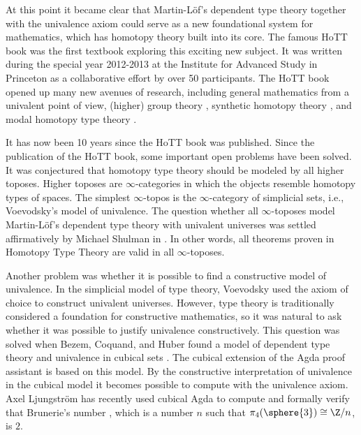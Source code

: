 At this point it became clear that Martin-L\"of's dependent type theory together with the univalence axiom could serve as a new foundational system for mathematics, which has homotopy theory built into its core. The famous HoTT book \cite{hottbook} was the first textbook exploring this exciting new subject. It was written during the special year 2012-2013 at the Institute for Advanced Study in Princeton as a collaborative effort by over 50 participants. The HoTT book opened up many new avenues of research, including general mathematics from a univalent point of view, (higher) group theory \cite{symmetrybook}, synthetic homotopy theory \cite{BruneriePhD}, and modal homotopy type theory \cite{Corfield,RSS}.

It has now been 10 years since the HoTT book was published. Since the publication of the HoTT book, some important open problems have been solved. It was conjectured that homotopy type theory should be modeled by all higher toposes. Higher toposes are $\infty$-categories in which the objects resemble homotopy types of spaces. The simplest $\infty$-topos is the $\infty$-category of simplicial sets, i.e., Voevodsky's model of univalence. The question whether all $\infty$-toposes model Martin-L\"of's dependent type theory with univalent universes was settled affirmatively by Michael Shulman in \cite{Shulman19}. In other words, all theorems proven in Homotopy Type Theory are valid in all $\infty$-toposes.

Another problem was whether it is possible to find a constructive model of univalence. In the simplicial model of type theory, Voevodsky used the axiom of choice to construct univalent universes. However, type theory is traditionally considered a foundation for constructive mathematics, so it was natural to ask whether it was possible to justify univalence constructively. This question was solved when Bezem, Coquand, and Huber found a model of dependent type theory and univalence in cubical sets \cite{BezemCoquandHuber,BCH19}. The cubical extension of the Agda proof assistant is based on this model. By the constructive interpretation of univalence in the cubical model it becomes possible to compute with the univalence axiom. Axel Ljungstr\"om has recently used cubical Agda to compute and formally verify that Brunerie's number \cite{BruneriePhD}, which is a number $n$ such that $\pi_4(\sphere{3})\cong\Z/n$, is $2$.


